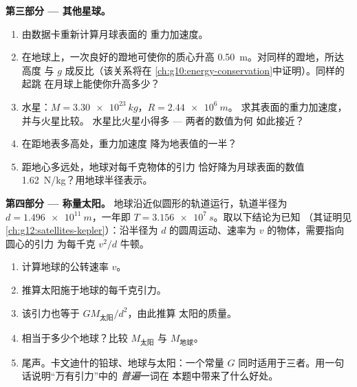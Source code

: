 \begin{problem}
\medskip
\noindent\textbf{第三部分 --- 其他星球。}
\begin{enumerate}[resume]
  \item 由数据卡重新计算月球表面的
        重力加速度。
  \item 在地球上，一次良好的蹬地可使你的质心升高
        \qty{0.50}{m}。对同样的蹬地，所达高度
        与 $g$ 成反比（该关系将在
        \cref{ch:g10:energy-conservation}中证明）。同样的起跳
        在月球上能使你升高多少？
  \item 水星：$M = \qty{3.30e23}{kg}$，$R = \qty{2.44e6}{m}$。
        求其表面的重力加速度，并与火星比较。
        水星比火星小得多 --- 两者的数值为何
        如此接近？
  \item 在距地表多高处，重力加速度
        降为地表值的一半？
  \item 距地心多远处，地球对每千克物体的引力
        恰好降为月球表面的数值
        \qty{1.62}{N/kg}？用地球半径表示。
\end{enumerate}

\medskip
\noindent\textbf{第四部分 --- 称量太阳。}
地球沿近似圆形的轨道运行，轨道半径为
$d = \qty{1.496e11}{m}$，一年即 $T = \qty{3.156e7}{s}$。取以下结论为已知
（其证明见\cref{ch:g12:satellites-kepler}）：沿半径为
$d$ 的圆周运动、速率为 $v$ 的物体，需要指向圆心的引力
为每千克 $v^2/d$ 牛顿。
\begin{enumerate}[resume]
  \item 计算地球的公转速率 $v$。
  \item 推算太阳施于地球的每千克引力。
  \item 该引力也等于 $G M_{\text{太阳}} / d^2$，由此推算
        太阳的质量。
  \item 相当于多少个地球？比较 $M_{\text{太阳}}$ 与
        $M_{\text{地球}}$。
  \item 尾声。卡文迪什的铅球、地球与太阳：一个常量
        $G$ 同时适用于三者。用一句话说明“万有引力”中的
        \emph{普遍}一词在
        本题中带来了什么好处。
\end{enumerate}
\end{problem}
